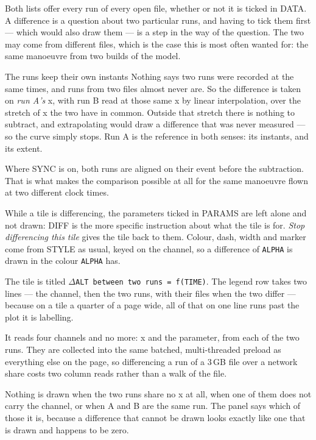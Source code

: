 \documentclass[11pt,a4paper,oneside]{report}
\newcommand{\code}[1]{\texttt{#1}}
\begin{document}
Both lists offer every run of every open file, whether or not it is ticked in
DATA. A difference is a question about two particular runs, and having to tick
them first --- which would also draw them --- is a step in the way of the
question. The two may come from different files, which is the case this is most
often wanted for: the same manoeuvre from two builds of the model.

\begin{aoenote}{The runs keep their own instants}
Nothing says two runs were recorded at the same times, and runs from two files
almost never are. So the difference is taken on \emph{run A's} x, with run B
read at those same x by linear interpolation, over the stretch of x the two have
in common. Outside that stretch there is nothing to subtract, and extrapolating
would draw a difference that was never measured --- so the curve simply stops.
Run A is the reference in both senses: its instants, and its extent.

Where SYNC is on, both runs are aligned on their event before the subtraction.
That is what makes the comparison possible at all for the same manoeuvre flown
at two different clock times.
\end{aoenote}

While a tile is differencing, the parameters ticked in PARAMS are left alone and
not drawn: DIFF is the more specific instruction about what the tile is for.
\emph{Stop differencing this tile} gives the tile back to them. Colour, dash,
width and marker come from STYLE as usual, keyed on the channel, so a difference
of \code{ALPHA} is drawn in the colour \code{ALPHA} has.

The tile is titled $\Delta$\code{ALT between two runs = f(TIME)}. The legend
row takes two lines --- the channel, then the two runs, with their files when
the two differ --- because on a tile a quarter of a page wide, all of that on
one line runs past the plot it is labelling.

It reads four channels and no more: x and the parameter, from each of the two
runs. They are collected into the same batched, multi-threaded preload as
everything else on the page, so differencing a run of a 3\,GB file over a network
share costs two column reads rather than a walk of the file.

Nothing is drawn when the two runs share no x at all, when one of them does not
carry the channel, or when A and B are the same run. The panel says which of
those it is, because a difference that cannot be drawn looks exactly like one
that is drawn and happens to be zero.
\end{document}
